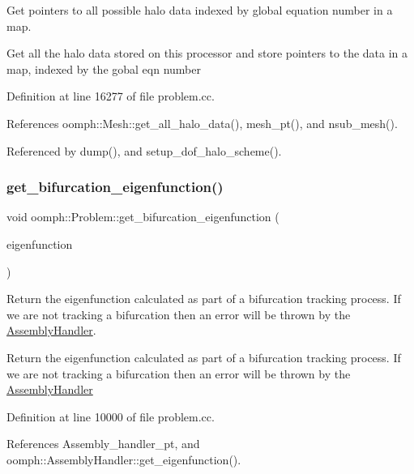 Get pointers to all possible halo data indexed by global equation number in a map. 

Get all the halo data stored on this processor and store pointers to the data in a map, indexed by the gobal eqn number 

Definition at line 16277 of file problem.\+cc.



References oomph\+::\+Mesh\+::get\+\_\+all\+\_\+halo\+\_\+data(), mesh\+\_\+pt(), and nsub\+\_\+mesh().



Referenced by dump(), and setup\+\_\+dof\+\_\+halo\+\_\+scheme().

\mbox{\label{classoomph_1_1Problem_a85b240c17750bdc32afafee35b50225a}} 
\subsubsection{\texorpdfstring{get\+\_\+bifurcation\+\_\+eigenfunction()}{get\_bifurcation\_eigenfunction()}}
{\footnotesize\ttfamily void oomph\+::\+Problem\+::get\+\_\+bifurcation\+\_\+eigenfunction (\begin{DoxyParamCaption}\item[{\hyperlink{classoomph_1_1Vector}{Vector}$<$ \hyperlink{classoomph_1_1DoubleVector}{Double\+Vector} $>$ \&}]{eigenfunction }\end{DoxyParamCaption})}



Return the eigenfunction calculated as part of a bifurcation tracking process. If we are not tracking a bifurcation then an error will be thrown by the \hyperlink{classoomph_1_1AssemblyHandler}{Assembly\+Handler}. 

Return the eigenfunction calculated as part of a bifurcation tracking process. If we are not tracking a bifurcation then an error will be thrown by the \hyperlink{classoomph_1_1AssemblyHandler}{Assembly\+Handler} 

Definition at line 10000 of file problem.\+cc.



References Assembly\+\_\+handler\+\_\+pt, and oomph\+::\+Assembly\+Handler\+::get\+\_\+eigenfunction().



